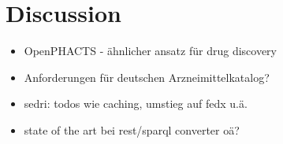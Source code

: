 
\chapter{Discussion}
\label{cha:discussion}

\begin{itemize}
\item OpenPHACTS - ähnlicher ansatz für drug discovery
\item Anforderungen für deutschen Arzneimittelkatalog?
\item sedri: todos wie caching, umstieg auf fedx u.ä.
\item state of the art bei rest/sparql converter oä?
\end{itemize}

